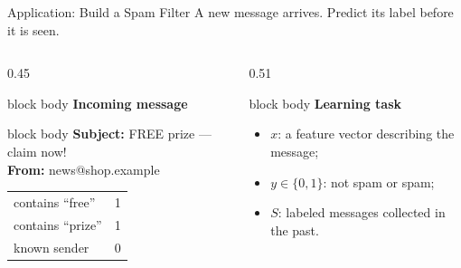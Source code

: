 \documentclass[aspectratio=169,10pt]{beamer}
\newcommand{\tightitems}{%
  \setlength{\itemsep}{0.14cm}%
  \setlength{\topsep}{0.08cm}%
  \setlength{\parsep}{0pt}%
}
\begin{document}
\begin{frame}[t]{Application: Build a Spam Filter}
  \vspace{0.10cm}
  \centering
  {\fontsize{15}{18}\selectfont A new message arrives. Predict its label before it is seen.}
  \vspace{0.18cm}
  \begin{columns}[T,totalwidth=\textwidth]
    \begin{column}{0.45\textwidth}
      \begin{beamercolorbox}[rounded=true,sep=0.23cm,wd=\linewidth]{block body}
        \centering
        {\bfseries\large Incoming message}\par
        \vspace{0.12cm}
        \begin{beamercolorbox}[rounded=true,sep=0.13cm,wd=0.94\linewidth]{block body}
          \centering
          \normalsize
          \textbf{Subject:} FREE prize --- claim now!\\[0.08cm]
          \textbf{From:} news@shop.example
        \end{beamercolorbox}
        \vspace{0.14cm}
        \renewcommand{\arraystretch}{1.12}
        \begin{tabular}{@{}ll@{}}
          contains ``free'' & 1\\
          contains ``prize'' & 1\\
          known sender & 0
        \end{tabular}
      \end{beamercolorbox}
    \end{column}
    \begin{column}{0.51\textwidth}
      \begin{beamercolorbox}[rounded=true,sep=0.23cm,wd=\linewidth]{block body}
        {\bfseries\large Learning task}\par
        \vspace{0.10cm}
        \begin{itemize}
          \tightitems
          \item $x$: a feature vector describing the message;
          \item $y\in\{0,1\}$: not spam or spam;
          \item $S$: labeled messages collected in the past.

\end{itemize}
\end{beamercolorbox}
\end{column}
\end{columns}
\end{frame}
\end{document}
